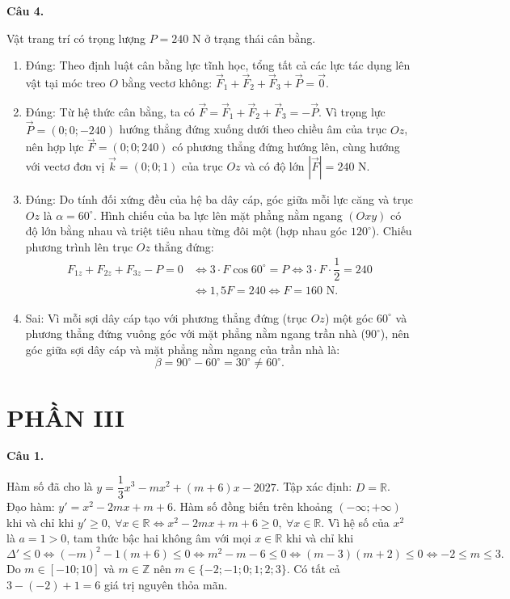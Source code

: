 \documentclass[12pt,a4paper]{article}
\newcommand{\loigiai}[1]{\par\medskip\Needspace{4\baselineskip}\noindent\textbf{#1}\par\nobreak}
\begin{document}
\loigiai{Câu 4.}
Vật trang trí có trọng lượng $P=240\text{ N}$ ở trạng thái cân bằng.
\begin{enumerate}
\item Đúng: Theo định luật cân bằng lực tĩnh học, tổng tất cả các lực tác dụng lên vật tại móc treo $O$ bằng vectơ không: $\vec{F}_1+\vec{F}_2+\vec{F}_3+\vec{P}=\vec{0}$.
\item Đúng: Từ hệ thức cân bằng, ta có $\vec{F}=\vec{F}_1+\vec{F}_2+\vec{F}_3=-\vec{P}$.
Vì trọng lực $\vec{P}=(0;0;-240)$ hướng thẳng đứng xuống dưới theo chiều âm của trục $Oz$, nên hợp lực $\vec{F}=(0;0;240)$ có phương thẳng đứng hướng lên, cùng hướng với vectơ đơn vị $\vec{k}=(0;0;1)$ của trục $Oz$ và có độ lớn $|\vec{F}|=240\text{ N}$.
\item Đúng: Do tính đối xứng đều của hệ ba dây cáp, góc giữa mỗi lực căng và trục $Oz$ là $\alpha=60^\circ$. Hình chiếu của ba lực lên mặt phẳng nằm ngang $(Oxy)$ có độ lớn bằng nhau và triệt tiêu nhau từng đôi một (hợp nhau góc $120^\circ$).
Chiếu phương trình lên trục $Oz$ thẳng đứng:
$$\begin{aligned}
F_{1z}+F_{2z}+F_{3z}-P=0 &\iff 3\cdot F\cos 60^\circ = P \iff 3\cdot F\cdot \dfrac{1}{2} = 240\\
&\iff 1{,}5F=240 \iff F=160\text{ N}.
\end{aligned}$$
\item Sai: Vì mỗi sợi dây cáp tạo với phương thẳng đứng (trục $Oz$) một góc $60^\circ$ và phương thẳng đứng vuông góc với mặt phẳng nằm ngang trần nhà ($90^\circ$), nên góc giữa sợi dây cáp và mặt phẳng nằm ngang của trần nhà là:
$$\beta = 90^\circ - 60^\circ = 30^\circ \ne 60^\circ.$$
\end{enumerate}

\section*{PHẦN III}

\loigiai{Câu 1.}
Hàm số đã cho là $y=\dfrac{1}{3}x^3-mx^2+(m+6)x-2027$.
Tập xác định: $D=\mathbb{R}$.
Đạo hàm: $y'=x^2-2mx+m+6$.
Hàm số đồng biến trên khoảng $(-\infty;+\infty)$ khi và chỉ khi
$y'\ge 0,\ \forall x\in\mathbb{R} \iff x^2-2mx+m+6\ge 0,\ \forall x\in\mathbb{R}$.
Vì hệ số của $x^2$ là $a=1>0$, tam thức bậc hai không âm với mọi $x\in\mathbb{R}$ khi và chỉ khi
$$\Delta' \le 0 \iff (-m)^2 - 1(m+6) \le 0 \iff m^2-m-6\le 0 \iff (m-3)(m+2)\le 0 \iff -2\le m\le 3.$$
Do $m\in[-10;10]$ và $m\in\mathbb{Z}$ nên $m\in\{-2;-1;0;1;2;3\}$.
Có tất cả $3-(-2)+1=6$ giá trị nguyên thỏa mãn.
\end{document}
